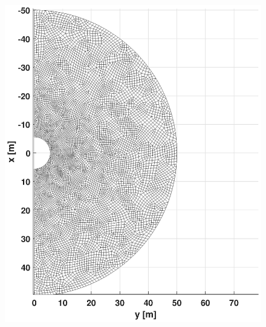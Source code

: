 \documentclass[12pt,a4paper,titlepage]{article}
\begin{document}
\begin{figure}[ht]
{\includegraphics[scale=0.45,trim = 120mm 8mm 170mm 16mm, clip]{figures/Softwind/FSmesh.eps}
}
\subfigure{
}
\end{figure}
\end{document}
